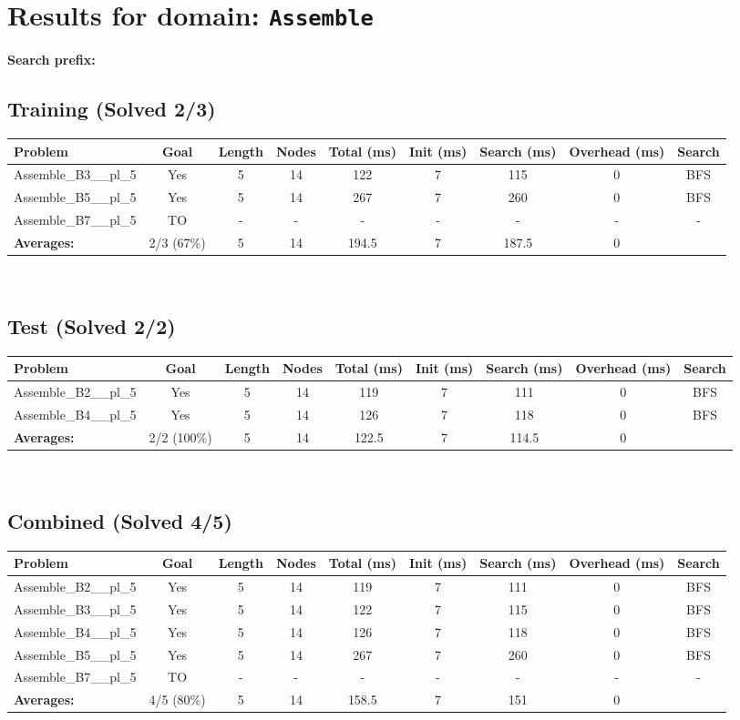 \documentclass{article}
\begin{document}
\section*{Results for domain: \texttt{Assemble}}
\textbf{Search prefix:} 
\\[0.5cm]
\subsection*{Training (Solved 2/3)}
\begin{tabular}{lcccccccc}
\toprule
Problem & Goal & Length & Nodes & Total (ms) & Init (ms) & Search (ms) & Overhead (ms) & Search \\
\midrule
Assemble\_B3\_\_pl\_5 & Yes & 5 & 14 & 122 & 7 & 115 & 0 & BFS \\
Assemble\_B5\_\_pl\_5 & Yes & 5 & 14 & 267 & 7 & 260 & 0 & BFS \\
Assemble\_B7\_\_pl\_5 & TO & - & - & - & - & - & - & - \\
\textbf{Averages:} & 2/3 (67\%) & 5 & 14 & 194.5 & 7 & 187.5 & 0 & \\
\bottomrule
\end{tabular}
\\[0.7cm]
\subsection*{Test (Solved 2/2)}
\begin{tabular}{lcccccccc}
\toprule
Problem & Goal & Length & Nodes & Total (ms) & Init (ms) & Search (ms) & Overhead (ms) & Search \\
\midrule
Assemble\_B2\_\_pl\_5 & Yes & 5 & 14 & 119 & 7 & 111 & 0 & BFS \\
Assemble\_B4\_\_pl\_5 & Yes & 5 & 14 & 126 & 7 & 118 & 0 & BFS \\
\textbf{Averages:} & 2/2 (100\%) & 5 & 14 & 122.5 & 7 & 114.5 & 0 & \\
\bottomrule
\end{tabular}
\\[0.7cm]
\subsection*{Combined (Solved 4/5)}
\begin{tabular}{lcccccccc}
\toprule
Problem & Goal & Length & Nodes & Total (ms) & Init (ms) & Search (ms) & Overhead (ms) & Search \\
\midrule
Assemble\_B2\_\_pl\_5 & Yes & 5 & 14 & 119 & 7 & 111 & 0 & BFS \\
Assemble\_B3\_\_pl\_5 & Yes & 5 & 14 & 122 & 7 & 115 & 0 & BFS \\
Assemble\_B4\_\_pl\_5 & Yes & 5 & 14 & 126 & 7 & 118 & 0 & BFS \\
Assemble\_B5\_\_pl\_5 & Yes & 5 & 14 & 267 & 7 & 260 & 0 & BFS \\
Assemble\_B7\_\_pl\_5 & TO & - & - & - & - & - & - & - \\
\textbf{Averages:} & 4/5 (80\%) & 5 & 14 & 158.5 & 7 & 151 & 0 & \\
\bottomrule
\end{tabular}
\\[0.7cm]
\end{document}
